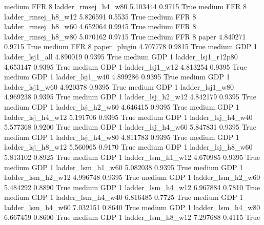     medium      FFR                 8    ladder_rmsej_h4_w80   5.103444      0.9715    True
    medium      FFR                 8    ladder_rmsej_h8_w12   5.826591      0.5535    True
    medium      FFR                 8    ladder_rmsej_h8_w60   4.652064      0.9945    True
    medium      FFR                 8    ladder_rmsej_h8_w80   5.070162      0.9715    True
    medium      FFR                 8                  paper   4.840271      0.9715    True
    medium      FFR                 8           paper_plugin   4.707778      0.9815    True
    medium      GDP                 1        ladder_lsj1_all   4.890019      0.9395    True
    medium      GDP                 1     ladder_lsj1_r12p80   4.653147      0.9395    True
    medium      GDP                 1        ladder_lsj1_w12   4.813254      0.9395    True
    medium      GDP                 1        ladder_lsj1_w40   4.899286      0.9395    True
    medium      GDP                 1        ladder_lsj1_w60   4.920378      0.9395    True
    medium      GDP                 1        ladder_lsj1_w80   4.969238      0.9395    True
    medium      GDP                 1      ladder_lsj_h2_w12   4.842179      0.9395    True
    medium      GDP                 1      ladder_lsj_h2_w60   4.646415      0.9395    True
    medium      GDP                 1      ladder_lsj_h4_w12   5.191706      0.9395    True
    medium      GDP                 1      ladder_lsj_h4_w40   5.577368      0.9200    True
    medium      GDP                 1      ladder_lsj_h4_w60   5.847831      0.9395    True
    medium      GDP                 1      ladder_lsj_h4_w80   4.811783      0.9395    True
    medium      GDP                 1      ladder_lsj_h8_w12   5.560965      0.9170    True
    medium      GDP                 1      ladder_lsj_h8_w60   5.813102      0.8925    True
    medium      GDP                 1      ladder_lsm_h1_w12   4.670985      0.9395    True
    medium      GDP                 1      ladder_lsm_h1_w60   5.082038      0.9395    True
    medium      GDP                 1      ladder_lsm_h2_w12   4.996748      0.9395    True
    medium      GDP                 1      ladder_lsm_h2_w60   5.484292      0.8890    True
    medium      GDP                 1      ladder_lsm_h4_w12   6.967884      0.7810    True
    medium      GDP                 1      ladder_lsm_h4_w40   6.816485      0.7725    True
    medium      GDP                 1      ladder_lsm_h4_w60   7.032151      0.8640    True
    medium      GDP                 1      ladder_lsm_h4_w80   6.667459      0.8600    True
    medium      GDP                 1      ladder_lsm_h8_w12   7.297688      0.4115    True
